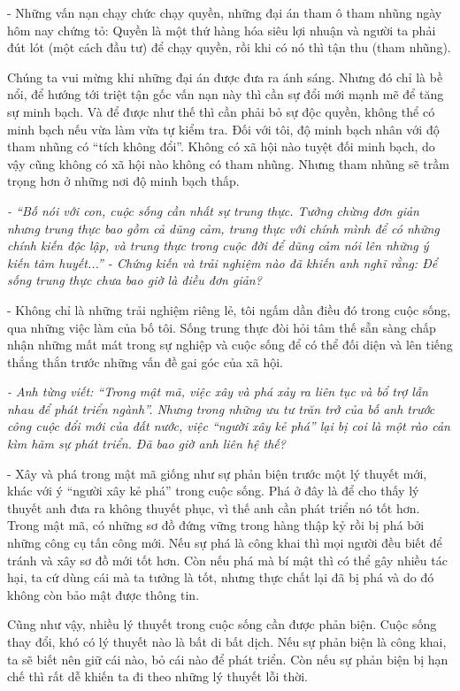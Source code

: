 - Những vấn nạn chạy chức chạy quyền, những đại án tham ô tham nhũng ngày hôm nay chứng tỏ: Quyền là một thứ hàng hóa siêu lợi nhuận và người ta phải đút lót (một cách đầu tư) để chạy quyền, rồi khi có nó thì tận thu (tham nhũng).

Chúng ta vui mừng khi những đại án được đưa ra ánh sáng. Nhưng đó chỉ là bề nổi, để hướng tới triệt tận gốc vấn nạn này thì cần sự đổi mới mạnh mẽ để tăng sự minh bạch. Và để được như thế thì cần phải bỏ sự độc quyền, không thể có minh bạch nếu vừa làm vừa tự kiểm tra. Đối với tôi, độ minh bạch nhân với độ tham nhũng có “tích không đổi”. Không có xã hội nào tuyệt đối minh bạch, do vậy cũng không có xã hội nào không có tham nhũng. Nhưng tham nhũng sẽ trầm trọng hơn ở những nơi độ minh bạch thấp.

\textit{- “Bố nói với con, cuộc sống cần nhất sự trung thực. Tưởng chừng đơn giản nhưng trung thực bao gồm cả dũng cảm, trung thực với chính mình để có những chính kiến độc lập, và trung thực trong cuộc đời để dũng cảm nói lên những ý kiến tâm huyết...” - Chứng kiến và trải nghiệm nào đã khiến anh nghĩ rằng: Để sống trung thực chưa bao giờ là điều đơn giản?}

- Không chỉ là những trải nghiệm riêng lẻ, tôi ngấm dần điều đó trong cuộc sống, qua những việc làm của bố tôi. Sống trung thực đòi hỏi tâm thế sẵn sàng chấp nhận những mất mát trong sự nghiệp và cuộc sống để có thể đối diện và lên tiếng thẳng thắn trước những vấn đề gai góc của xã hội.

\textit{- Anh từng viết: “Trong mật mã, việc xây và phá xảy ra liên tục và bổ trợ lẫn nhau để phát triển ngành”. Nhưng trong những ưu tư trăn trở của bố anh trước công cuộc đổi mới của đất nước, việc “người xây kẻ phá” lại bị coi là một rào cản kìm hãm sự phát triển. Đã bao giờ anh liên hệ thế?}

- Xây và phá trong mật mã giống như sự phản biện trước một lý thuyết mới, khác với ý “người xây kẻ phá” trong cuộc sống. Phá ở đây là để cho thấy lý thuyết anh đưa ra không thuyết phục, vì thế anh cần phát triển nó tốt hơn. Trong mật mã, có những sơ đồ đứng vững trong hàng thập kỷ rồi bị phá bởi những công cụ tấn công mới. Nếu sự phá là công khai thì mọi người đều biết để tránh và xây sơ đồ mới tốt hơn. Còn nếu phá mà bí mật thì có thể gây nhiều tác hại, ta cứ dùng cái mà ta tưởng là tốt, nhưng thực chất lại đã bị phá và do đó không còn bảo mật được thông tin.

Cũng như vậy, nhiều lý thuyết trong cuộc sống cần được phản biện. Cuộc sống thay đổi, khó có lý thuyết nào là bất di bất dịch. Nếu sự phản biện là công khai, ta sẽ biết nên giữ cái nào, bỏ cái nào để phát triển. Còn nếu sự phản biện bị hạn chế thì rất dễ khiến ta đi theo những lý thuyết lỗi thời. 
